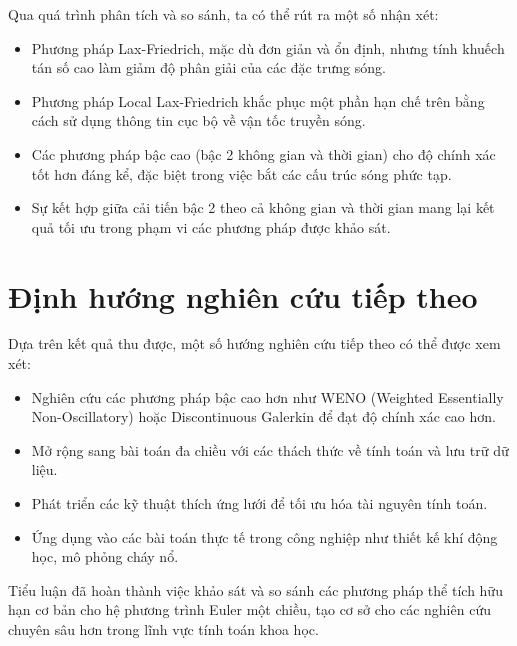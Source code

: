 Qua quá trình phân tích và so sánh, ta có thể rút ra một số nhận xét:

\begin{itemize}
    \item Phương pháp Lax-Friedrich, mặc dù đơn giản và ổn định, nhưng tính khuếch tán số cao làm giảm độ phân giải của các đặc trưng sóng.
    
    \item Phương pháp Local Lax-Friedrich khắc phục một phần hạn chế trên bằng cách sử dụng thông tin cục bộ về vận tốc truyền sóng.
    
    \item Các phương pháp bậc cao (bậc 2 không gian và thời gian) cho độ chính xác tốt hơn đáng kể, đặc biệt trong việc bắt các cấu trúc sóng phức tạp.
    
    \item Sự kết hợp giữa cải tiến bậc 2 theo cả không gian và thời gian mang lại kết quả tối ưu trong phạm vi các phương pháp được khảo sát.
\end{itemize}

\section*{Định hướng nghiên cứu tiếp theo}

Dựa trên kết quả thu được, một số hướng nghiên cứu tiếp theo có thể được xem xét:

\begin{itemize}
    \item Nghiên cứu các phương pháp bậc cao hơn như WENO (Weighted Essentially Non-Oscillatory) hoặc Discontinuous Galerkin để đạt độ chính xác cao hơn.
    
    \item Mở rộng sang bài toán đa chiều với các thách thức về tính toán và lưu trữ dữ liệu.
    
    \item Phát triển các kỹ thuật thích ứng lưới để tối ưu hóa tài nguyên tính toán.
    
    \item Ứng dụng vào các bài toán thực tế trong công nghiệp như thiết kế khí động học, mô phỏng cháy nổ.
\end{itemize}

Tiểu luận đã hoàn thành việc khảo sát và so sánh các phương pháp thể tích hữu hạn cơ bản cho hệ phương trình Euler một chiều, tạo cơ sở cho các nghiên cứu chuyên sâu hơn trong lĩnh vực tính toán khoa học.